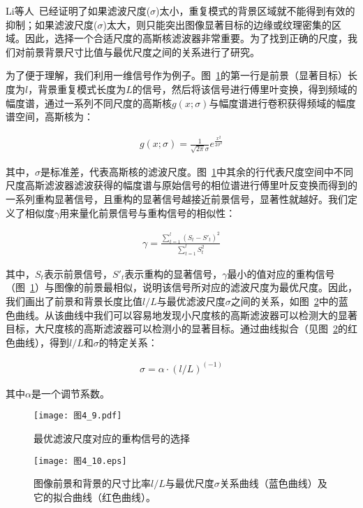 Li等人~\cite{LiJianTPAMI2013Scale}已经证明了如果滤波尺度($\sigma$)太小，重复模式的背景区域就不能得到有效的抑制；如果滤波尺度($\sigma$)太大，则只能突出图像显著目标的边缘或纹理密集的区域。因此，选择一个合适尺度的高斯核滤波器非常重要。为了找到正确的尺度，我们对前景背景尺寸比值与最优尺度之间的关系进行了研究。

为了便于理解，我们利用一维信号作为例子。图~\ref{图4_9}的第一行是前景（显著目标）长度为$l$，背景重复模式长度为$L$的信号，然后将该信号进行傅里叶变换，得到频域的幅度谱，通过一系列不同尺度的高斯核$g(x;\sigma)$与幅度谱进行卷积获得频域的幅度谱空间，高斯核为：
\begin{linenomath}
\begin{align}
g(x;\sigma)=\frac{1}{\sqrt{2\pi}\sigma}e^{\frac{x^{2}}{2\sigma^{2}}}
\label{式4_5}
\end{align}
\end{linenomath}
其中，$\sigma$是标准差，代表高斯核的滤波尺度。图~\ref{图4_9}中其余的行代表尺度空间中不同尺度高斯滤波器滤波获得的幅度谱与原始信号的相位谱进行傅里叶反变换而得到的一系列重构显著信号，且重构的显著信号越接近前景信号，显著性就越好。我们定义了相似度$\gamma$用来量化前景信号与重构信号的相似性：
\begin{linenomath}
\begin{align}
\gamma=\frac{\sum_{t=1}^{l}(S_{t}-S'_{t})^{2}}{\sum_{t=1}^{l}S_{t}^{2}}
\label{式4_6}
\end{align}
\end{linenomath}
其中，$S_{t}$表示前景信号，$S'_{t}$表示重构的显著信号，$\gamma$最小的值对应的重构信号（图~\ref{图4_9}）与图像的前景最相似，说明该信号所对应的滤波尺度为最优尺度。因此，我们画出了前景和背景长度比值$l/L$与最优滤波尺度$\sigma$之间的关系，如图~\ref{图4_10}中的蓝色曲线。从该曲线中我们可以容易地发现小尺度核的高斯滤波器可以检测大的显著目标，大尺度核的高斯滤波器可以检测小的显著目标。通过曲线拟合（见图~\ref{图4_10}的红色曲线），得到$l/L$和$\sigma$的特定关系：
\begin{linenomath}
\begin{align}
\sigma=\alpha\cdot(l/L)^{(-1)}
\label{式4_7}
\end{align}
\end{linenomath}
其中$\alpha$是一个调节系数。
\begin{figure}[h]
  \centering
  \texttt{[image: 图4\_9.pdf]}
  \caption{最优滤波尺度对应的重构信号的选择}   
  \label{图4_9} 
\end{figure}
\begin{figure}[h]
  \centering
  \texttt{[image: 图4\_10.eps]}
  \caption{图像前景和背景的尺寸比率$l/L$与最优尺度$\sigma$关系曲线（蓝色曲线）及它的拟合曲线（红色曲线）。}   
  \label{图4_10} 
\end{figure}


